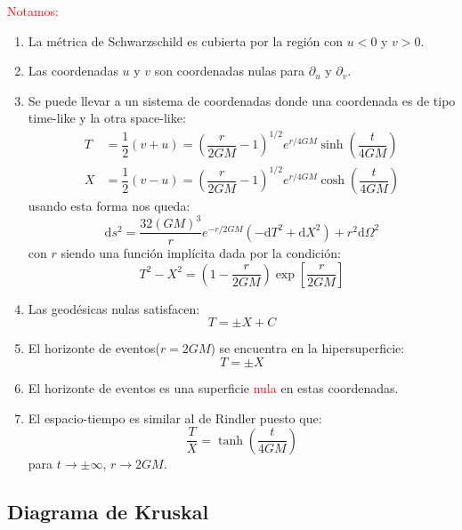 \documentclass[../main]{subfiles}
\begin{document}
\begin{adjustwidth}{0pt}{-100pt}
\textcolor{red}{Notamos:}
\begin{enumerate}
    \item La métrica de Schwarzschild es cubierta por la región con $u<0$ y $v>0$.
    \item Las coordenadas $u$ y $v$ son coordenadas nulas para $\partial_u$ y $\partial_v$.
    \item Se puede llevar a un sistema de coordenadas donde una coordenada es de tipo time-like y la otra space-like:
    \begin{align}
        T&=\dfrac{1}{2}(v+u)=\left(\dfrac{r}{2GM}-1\right)^{1/2}e^{r/4GM}\sinh\left(\dfrac{t}{4GM}\right)\\
        X&=\dfrac{1}{2}(v-u)=\left(\dfrac{r}{2GM}-1\right)^{1/2}e^{r/4GM}\cosh\left(\dfrac{t}{4GM}\right)
    \end{align}
    usando esta forma nos queda:
    \begin{equation}
        \mathrm{d}s^2=\dfrac{32(GM)^3}{r}e^{-r/2GM}(-\mathrm{d}T^2+\mathrm{d}X^2)+r^2\mathrm{d}\Omega^2
    \end{equation}
    con $r$ siendo una función implícita dada por la condición:
    \begin{equation}
        T^2-X^2=\left(1-\dfrac{r}{2GM}\right)\exp\left[\dfrac{r}{2GM}\right]
    \end{equation}
    \item Las geodésicas nulas satisfacen:
    \begin{equation}
        T=\pm X+C
    \end{equation}
    \item El horizonte de eventos($r=2GM$) se encuentra en la hipersuperficie:
    \begin{equation}
        T=\pm X
    \end{equation}
    \item El horizonte de eventos es una superficie \textcolor{red}{nula} en estas coordenadas.
    \item El espacio-tiempo es similar al de Rindler puesto que:
    \begin{equation}
        \dfrac{T}{X}=\tanh\left(\dfrac{t}{4GM}\right)
    \end{equation}
    para $t\rightarrow \pm \infty$, $r \rightarrow 2GM$.
\end{enumerate}

\subsection{Diagrama de Kruskal}


\end{adjustwidth}
\end{document}
